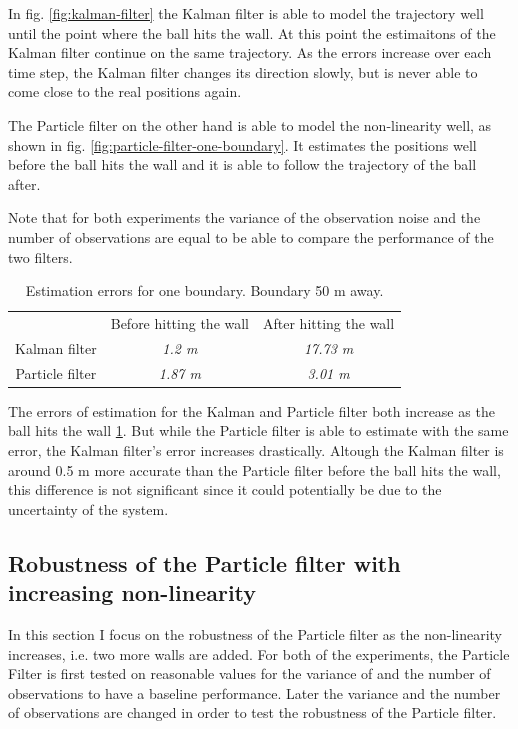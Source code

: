 \documentclass[conference]{IEEEtran}
\begin{document}
In fig. \ref{fig:kalman-filter} the Kalman filter is able to model the trajectory well until the point where the ball hits the wall. 
At this point the estimaitons of the Kalman filter continue on the same trajectory. 
As the errors increase over each time step, the Kalman filter changes its direction slowly, but is never able to come close to the real positions again.

The Particle filter on the other hand is able to model the non-linearity well, as shown in fig. \ref{fig:particle-filter-one-boundary}.
It estimates the positions well before the ball hits the wall and it is able to follow the trajectory of the ball after.

Note that for both experiments the variance of the observation noise and the number of observations are equal to be able to compare the performance of the two filters.  

\begin{table}[htbp]
    \caption{Estimation errors for one boundary. Boundary 50 m away.}
    \begin{center}
    \begin{tabular}{|c|c|c|}
    \cline{1-3}
    & Before hitting the wall & After hitting the wall \\
    \cline{1-3} 
    Kalman filter & \textit{1.2 m} & \textit{17.73 m} \\
    \cline{1-3} 
    Particle filter & \textit{1.87 m} & \textit{3.01 m} \\
    \hline
    \end{tabular}
    \label{tab:comparing-kalman-particle}
    \end{center}
\end{table}

The errors of estimation for the Kalman and Particle filter both increase as the ball hits the wall \ref{tab:comparing-kalman-particle}.
But while the Particle filter is able to estimate with the same error, the Kalman filter's error increases drastically.
Altough the Kalman filter is around 0.5 m more accurate than the Particle filter before the ball hits the wall, this difference is not significant since it could potentially be due to the uncertainty of the system.


\subsection{Robustness of the Particle filter with increasing non-linearity}

In this section I focus on the robustness of the Particle filter as the non-linearity increases, i.e. two more walls are added.
For both of the experiments, the Particle Filter is first tested on reasonable values for the variance of and the number of observations to have a baseline performance.
Later the variance and the number of observations are changed in order to test the robustness of the Particle filter. 
\end{document}
